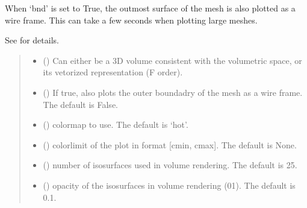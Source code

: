 \documentclass[letterpaper,10pt,english]{sphinxmanual}
\begin{document}
\begin{fulllineitems}
\begin{fulllineitems}
\sphinxAtStartPar
When ‘bnd’ is set to True, the outmost surface of the mesh is also plotted as a wire frame.
This can take a few seconds when plotting large meshes.

\sphinxAtStartPar
See {\hyperref[\detokenize{_autosummary/nirfasterff.visualize.plotvol:nirfasterff.visualize.plotvol}]{}} for details.
\begin{quote}\begin{description}
\begin{itemize}
\item {} 
\sphinxAtStartPar
{} () \textendash{} Can either be a 3D volume consistent with the volumetric space, or its vetorized representation (F order).

\item {} 
\sphinxAtStartPar
{} (\sphinxstyleliteralemphasis{\sphinxupquote{, }}) \textendash{} If true, also plots the outer boundadry of the mesh as a wire frame. The default is False.

\item {} 
\sphinxAtStartPar
{} (\sphinxstyleliteralemphasis{\sphinxupquote{, }}) \textendash{} colormap to use. The default is ‘hot’.

\item {} 
\sphinxAtStartPar
{} (\sphinxstyleliteralemphasis{\sphinxupquote{, }}) \textendash{} colorlimit of the plot in format {[}cmin, cmax{]}. The default is None.

\item {} 
\sphinxAtStartPar
{} (\sphinxstyleliteralemphasis{\sphinxupquote{, }}) \textendash{} number of isosurfaces used in volume rendering. The default is 25.

\item {} 
\sphinxAtStartPar
{} (\sphinxstyleliteralemphasis{\sphinxupquote{, }}) \textendash{} opacity of the isosurfaces in volume rendering (0\sphinxhyphen{}1). The default is 0.1.


\end{itemize}
\end{description}
\end{quote}
\end{fulllineitems}
\end{fulllineitems}
\end{document}
